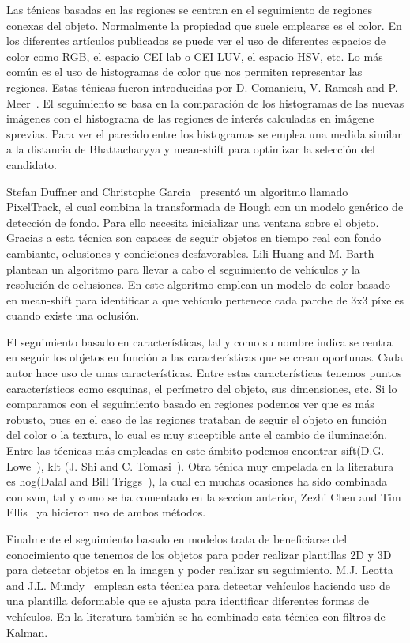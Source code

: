 Las ténicas basadas en las regiones se centran en el seguimiento de regiones conexas del objeto. Normalmente la propiedad que suele emplearse es el color. En los diferentes artículos publicados se puede ver el uso de diferentes espacios de color como RGB, el espacio CEI lab o CEI LUV, el espacio HSV, etc. Lo más común es el uso de histogramas de color que nos permiten representar las regiones. Estas ténicas fueron introducidas por D. Comaniciu, V. Ramesh and P. Meer~\cite{kernel_based_object}. El seguimiento se basa en la comparación de los histogramas de las nuevas imágenes con el histograma de las regiones de interés calculadas en imágene sprevias. Para ver el parecido entre los histogramas se emplea una medida similar a la distancia de Bhattacharyya y mean-shift para optimizar la selección del candidato.

Stefan Duffner and Christophe Garcia~\cite{pixeltrack} presentó un algoritmo llamado PixelTrack, el cual combina la transformada de Hough con un modelo genérico de detección de fondo. Para ello necesita inicializar una ventana sobre el objeto. Gracias a esta técnica son capaces de seguir objetos en tiempo real con fondo cambiante, oclusiones y condiciones desfavorables.
Lili Huang and M. Barth~\cite{real_time_vehicle} plantean un algoritmo para llevar a cabo el seguimiento de vehículos y la resolución de oclusiones. En este algoritmo emplean un modelo de color basado en mean-shift para identificar a que vehículo pertenece cada parche de 3x3 píxeles cuando existe una oclusión.

El seguimiento basado en características, tal y como su nombre indica se centra en seguir los objetos en función a las características que se crean oportunas. Cada autor hace uso de unas características. Entre estas características tenemos puntos característicos como esquinas, el perímetro del objeto, sus dimensiones, etc. Si lo comparamos con el seguimiento basado en regiones podemos ver que es más robusto, pues en el caso de las regiones trataban de seguir el objeto en función del color o la textura, lo cual es muy suceptible ante el cambio de iluminación. Entre las técnicas más empleadas en este ámbito podemos encontrar \acrfull{sift}(D.G. Lowe~\cite{article_sift}), \acrfull{klt} (J. Shi and C. Tomasi~\cite{article_klt}). Otra ténica muy empelada en la literatura es \acrshort{hog}(Dalal and Bill Triggs~\cite{hog_paper}), la cual en muchas ocasiones ha sido combinada con \acrshort{svm}, tal y como se ha comentado en la seccion anterior, Zezhi Chen and Tim Ellis~\cite{multi_shape_descriptor} ya hicieron uso de ambos métodos.


Finalmente el seguimiento basado en modelos trata de beneficiarse del conocimiento que tenemos de los objetos para poder realizar plantillas 2D y 3D para detectar objetos en la imagen y poder realizar su seguimiento. M.J. Leotta and J.L. Mundy~\cite{vehicle_surveillance_3d} emplean esta técnica para detectar vehículos haciendo uso de una plantilla deformable que se ajusta para identificar diferentes formas de vehículos. En la literatura también se ha combinado esta técnica con filtros de Kalman.





